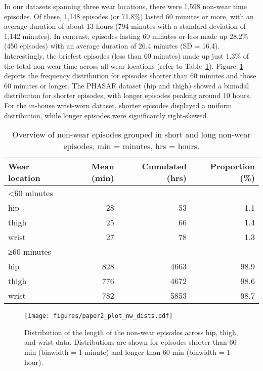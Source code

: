 \documentclass[
  10pt,
]{scrbook}
\begin{document}
In our datasets spanning three wear locations, there were 1,598 non-wear
time episodes. Of these, 1,148 episodes (or 71.8\%) lasted 60 minutes or
more, with an average duration of about 13 hours (794 minutes with a
standard deviation of 1,142 minutes). In contrast, episodes lasting 60
minutes or less made up 28.2\% (450 episodes) with an average duration
of 26.4 minutes (SD = 16.4). Interestingly, the briefest episodes (less
than 60 minutes) made up just 1.3\% of the total non-wear time across
all wear locations (refer to Table~\ref{tbl-9}).
Figure~\ref{fig-paper2_nw_dists} depicts the frequency distribution for
episodes shorter than 60 minutes and those 60 minutes or longer. The
PHASAR dataset (hip and thigh) showed a bimodal distribution for shorter
episodes, with longer episodes peaking around 10 hours. For the in-house
wrist-worn dataset, shorter episodes displayed a uniform distribution,
while longer episodes were significantly right-skewed.

\begingroup

\footnotesize

\hypertarget{tbl-9}{}
\begin{longtable}{lrrr}
\caption{\label{tbl-9}Overview of non-wear episodes grouped in short and long non-wear
episodes, min = minutes, hrs = hours. }\tabularnewline

\toprule
Wear location & Mean (min) & Cumulated (hrs) & Proportion (\%) \\ 
\midrule
\multicolumn{4}{l}{<60 minutes} \\ 
\midrule
hip & 28 & 53 & 1.1 \\ 
thigh & 25 & 66 & 1.4 \\ 
wrist & 27 & 78 & 1.3 \\ 
\midrule
\multicolumn{4}{l}{≥60 minutes} \\ 
\midrule
hip & 828 & 4663 & 98.9 \\ 
thigh & 776 & 4672 & 98.6 \\ 
wrist & 782 & 5853 & 98.7 \\ 
\bottomrule
\end{longtable}

\endgroup

\begin{figure}

{\centering \texttt{[image: figures/paper2\_plot\_nw\_dists.pdf]}

}

\caption{\label{fig-paper2_nw_dists}Distribution of the length of the
non-wear episodes across hip, thigh, and wrist data. Distributions are
shown for episodes shorter than 60 min (binwidth = 1 minute) and longer
than 60 min (binwidth = 1 hour).}

\end{figure}
\end{document}
